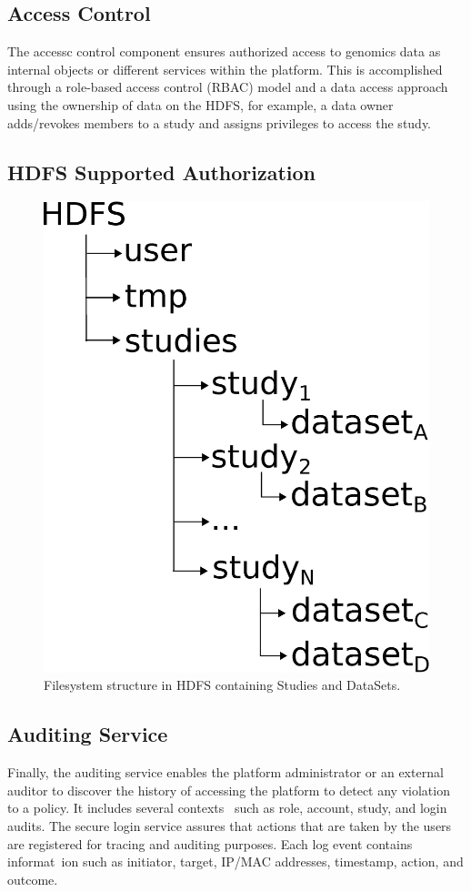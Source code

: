 \subsection {Access Control}
The accessc control component ensures authorized access to genomics data as internal objects or different services within the platform. This is accomplished through a role-based access control (RBAC) model and a data access approach using the ownership of data on the HDFS, for example, a data owner adds/revokes members to a study and assigns privileges to access the study.


\subsection{HDFS Supported Authorization}

\begin{figure}[h]
 \centering
 \includegraphics[scale=0.2]{./imgs/HDFS-structure.eps}
 \caption{Filesystem structure in HDFS containing Studies and DataSets.}
\end{figure}


\subsection {Auditing Service}
Finally, the auditing service enables the platform administrator or an external auditor to discover the history of accessing the platform to detect any violation to a policy. It includes several contexts \
such as role, account, study, and login audits. The secure login service assures that actions that are taken by the users are registered for tracing and auditing purposes. Each log event contains informat\
ion such as initiator, target, IP/MAC addresses, timestamp, action, and outcome.
